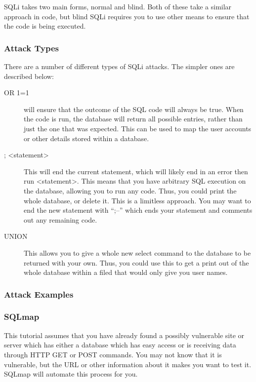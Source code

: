 \documentclass[a4paper,11pt]{report}
\begin{document}
		SQLi takes two main forms, normal and blind. 
		Both of these take a similar approach in code, but blind SQLi requires you to use other means to ensure that the code is being executed. 
		\subsubsection{Attack Types}
			There are a number of different types of SQLi attacks. 
			The simpler ones are described below:
			\begin{description}
				\item[OR 1=1] will ensure that the outcome of the SQL code will always be true. 
					When the code is run, the database will return all possible entries, rather than just the one that was expected. 
					This can be used to map the user accounts or other details stored within a database. 
				\item[; <statement>] This will end the current statement, which will likely end in an error then run <statement>.
					This means that you have arbitrary SQL execution on the database, allowing you to run any code. 
					Thus, you could print the whole database, or delete it. 
					This is a limitless approach. 
					You may want to end the new statement with ``;--'' which ends your statement and comments out any remaining code. 
				\item[UNION] This allows you to give a whole new select command to the database to be returned with your own. 
					Thus, you could use this to get a print out of the whole database within a filed that would only give you user names. 

			\end{description}
		\subsubsection{Attack Examples}
			
		\subsubsection{SQLmap}
			This tutorial assumes that you have already found a possibly vulnerable site or server which has either a database which has easy access or is receiving data through HTTP GET or POST commands. 
			You may not know that it is vulnerable, but the URL or other information about it makes you want to test it. 
			SQLmap will automate this process for you. 
\end{document}
